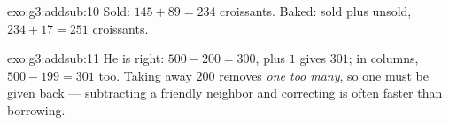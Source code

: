 \begin{solution}{exo:g3:addsub:10}
Sold: $145 + 89 = 234$ croissants. Baked: sold plus unsold,
$234 + 17 = 251$ croissants.
\end{solution}

\begin{solution}{exo:g3:addsub:11}
He is right: $500 - 200 = 300$, plus $1$ gives $301$; in columns,
$500 - 199 = 301$ too. Taking away $200$ removes \emph{one too many},
so one must be given back --- subtracting a friendly neighbor and
correcting is often faster than borrowing.
\end{solution}
